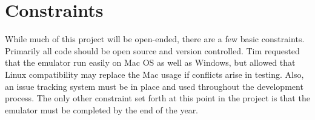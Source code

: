 \documentclass[12pt]{article}
\begin{document}
\section{Constraints}
        While much of this project will be open-ended, there are a few basic constraints. Primarily all code should be open source and version controlled. Tim requested that the emulator run easily on Mac OS as well as Windows, but allowed that Linux compatibility may replace the Mac usage if conflicts arise in testing. Also, an issue tracking system must be in place and used throughout the development process. The only other constraint set forth at this point in the project is that the emulator must be completed by the end of the year.
\end{document}
